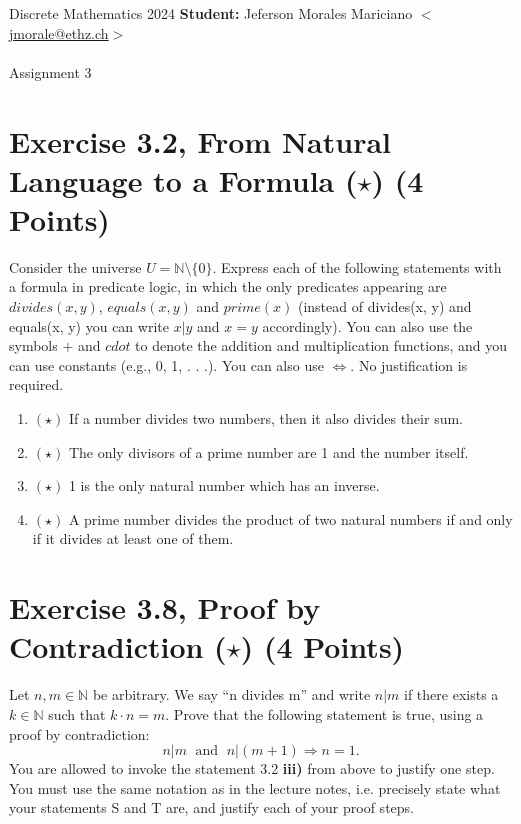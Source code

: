 \documentclass[unicode,11pt,a4paper,oneside,numbers=endperiod,openany]{scrartcl}
\begin{document}
\setassignment
{}

\serieheader
{Discrete Mathematics}
{2024}
{%
\textbf{Student:} Jeferson Morales Mariciano 
\href{mailto:jmorale@ethz.ch}{\(<\)jmorale@ethz.ch\(>\)} \\\\}
{\vspace{-1cm}}%
{Assignment 3}{}

\section*{Exercise 3.2, From Natural Language to a Formula (\(\star\)) \hfill (4 Points)}

Consider the universe \(U = \mathbb{N} \setminus\{0\}\). 
Express each of the following statements with a formula in predicate logic, 
in which the only predicates appearing are 
\(divides(x, y)\), \(equals(x, y)\) and \(prime(x)\) 
(instead of divides(x, y) and equals(x, y) you can write \(x | y\) and \(x = y\) accordingly). 
You can also use the symbols \(+\) and \(cdot\) 
to denote the addition and multiplication functions, 
and you can use constants (e.g., 0, 1, . . .). 
You can also use \(\Leftrightarrow\). 
No justification is required.

\begin{enumerate}[label=(\roman*)]
    \item \((\star)\) If a number divides two numbers, then it also divides their sum.
    \item \((\star)\) The only divisors of a prime number are 1 and the number itself.
    \item \((\star)\) 1 is the only natural number which has an inverse.
    \item \((\star)\) A prime number divides the product of two natural numbers 
        if and only if it divides at least one of them.
\end{enumerate}



\section*{Exercise 3.8, Proof by Contradiction (\(\star\)) \hfill (4 Points)}

Let \(n, m \in \mathbb{N}\) be arbitrary. 
We say “n divides m” and write \(n | m\) 
if there exists a \(k \in \mathbb{N}\) such that \(k \cdot n = m\). 
Prove that the following statement is true, 
using a proof by contradiction:
\[
n | m \;\text{ and }\; n |(m + 1) \Longrightarrow n = 1.
\]
You are allowed to invoke the statement 3.2 \textbf{iii)} from above to justify one step.
You must use the same notation as in the lecture notes, 
i.e. precisely state what your statements S and T are, 
and justify each of your proof steps.
\end{document}
